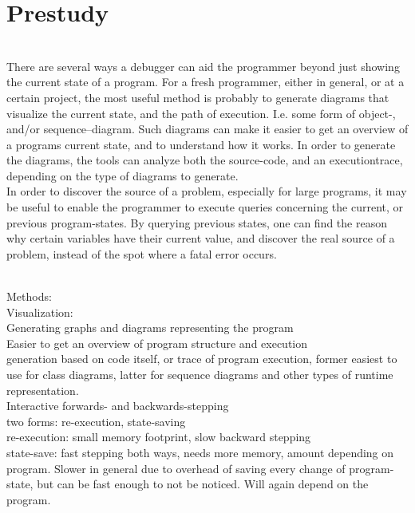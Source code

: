\section{Prestudy}\label{Prestudy}
~\\

There are several ways a debugger can aid the programmer beyond just showing the current state of a program.
For a fresh programmer, either in general, or at a certain project, the most useful method is probably to generate diagrams that visualize the current state, and the path of execution.
I.e. some form of object-, and/or sequence--diagram.
Such diagrams can make it easier to get an overview of a programs current state, and to understand how it works.
In order to generate the diagrams, the tools can analyze both the source-code, and an \gls{executiontrace}, depending on the type of diagrams to generate.
~\\

In order to discover the source of a problem, especially for large programs, it may be useful to enable the programmer to execute queries concerning the current, or previous program-states.
By querying previous states, one can find the reason why certain variables have their current value, and discover the real source of a problem, instead of the spot where a fatal error occurs.


~\\
Methods:\\

Visualization:\\
	Generating graphs and diagrams representing the program\\
	Easier to get an overview of program structure and execution\\
	generation based on code itself, or trace of program execution, former easiest to use for class diagrams, latter for sequence diagrams and other types of runtime representation.\\

Interactive forwards- and backwards-stepping\\
	two forms: re-execution, state-saving\\
	re-execution: small memory footprint, slow backward stepping\\
	state-save: fast stepping both ways, needs more memory, amount depending on program. Slower in general due to overhead of saving every change of program-state, but can be fast enough to not be noticed. Will again depend on the program.\\

